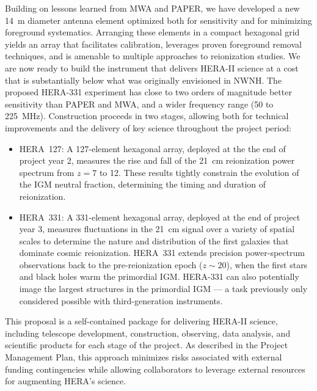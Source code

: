 \documentclass[preprint]{aastex}
\begin{document}
Building on lessons learned from MWA and PAPER, we have developed a new 14~m diameter antenna element 
optimized both for sensitivity and for minimizing foreground systematics.  
Arranging these elements in a compact hexagonal grid yields an array that
facilitates calibration, leverages proven foreground removal techniques, and is amenable 
to multiple approaches to reionization studies. We are now ready to build the instrument
that delivers HERA-II science at a cost that is substantially below what was originally envisioned in NWNH.
The proposed HERA-331 experiment has close to two orders of magnitude better
sensitivity than PAPER and MWA, and a wider frequency range (50 to 225~MHz). 
Construction proceeds in two stages, allowing both for technical improvements and the delivery of 
key science throughout the project period: 

\begin{itemize}[noitemsep,nolistsep]

\item HERA~127: A 127-element hexagonal array, deployed at the
the end of project year 2, measures the rise and fall of the
21~cm reionization power spectrum from $z = 7$ to 12. These results tightly
constrain the evolution of the IGM neutral fraction, determining
the timing and duration of reionization. %

\item HERA~331: A 331-element hexagonal array, deployed at the end of project year 3,
measures fluctuations in the 21~cm signal over a variety of spatial
scales to determine the nature and distribution of the first galaxies
that dominate cosmic reionization. HERA~331 extends precision
power-spectrum observations back to the pre-reionization epoch ($z \sim 20$), 
when the first stars and black holes warm the primordial IGM. HERA-331 can also potentially 
image the largest structures in the primordial
IGM --- a task previously only considered possible with third-generation
instruments. 

\end{itemize}

This proposal is a self-contained package for delivering HERA-II science,
including telescope development, construction, observing, data analysis,
and scientific products for each stage of the project.  As described
in the Project Management Plan, this approach minimizes
risks associated with external funding contingencies while allowing 
collaborators to leverage external resources for augmenting HERA's science.
\end{document}
